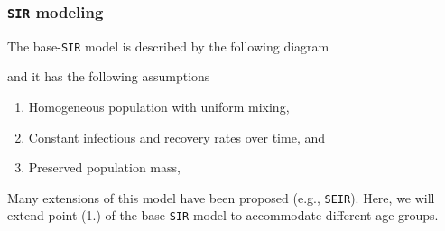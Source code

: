 \documentclass[12pt, aspectratio = 169]{beamer} %
\begin{document}
	\begin{frame}[t]
		\frametitle{\texttt{SIR} modeling}
		\justifying
		
		The base-\texttt{SIR} model \citep{kermack1927contribution} is described by the following diagram\vspace{-12pt}
		\begin{figure}[!ht]
		\end{figure}
		and it has the following assumptions
		\begin{enumerate}
			\item Homogeneous population with uniform mixing,
			\item Constant infectious and recovery rates over time, and
			\item Preserved population mass,
		\end{enumerate}

		\pause

		Many extensions of this model have been proposed (e.g., \texttt{SEIR}). Here, we will extend point (1.) of the base-\texttt{SIR} model to accommodate different age groups.

	\end{frame}
\end{document}
